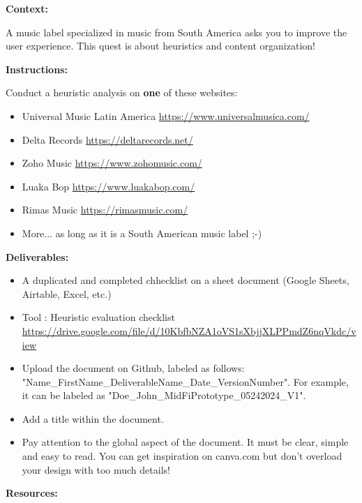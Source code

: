 \makeheaderfiles

\textbf{Context:}

A music label specialized in music from South America asks you to improve the user experience. This quest is about heuristics and content organization!

\textbf{Instructions:}

Conduct a heuristic analysis on \textbf{one} of these websites:

\begin{itemize}
\item Universal Music Latin America \url{https://www.universalmusica.com/}
\item Delta Records \url{https://deltarecords.net/}
\item Zoho Music \url{https://www.zohomusic.com/}
\item Luaka Bop \url{https://www.luakabop.com/}
\item Rimas Music \url{https://rimasmusic.com/}
\item More... as long as it is a South American music label ;-)
\end{itemize}

\textbf{Deliverables:}

\begin{itemize}
\item A duplicated and completed chhecklist on a sheet document (Google Sheets, Airtable, Excel, etc.)
\item Tool : Heuristic evaluation checklist \url{https://drive.google.com/file/d/10KbfbNZA1oVS1sXbjjXLPPmdZ6nqVkdc/view}
\item Upload the document on Github, labeled as follows: "Name\_FirstName\_DeliverableName\_Date\_VersionNumber". For example, it can be labeled as "Doe\_John\_MidFiPrototype\_05242024\_V1".
\item Add a title within the document.
\item Pay attention to the global aspect of the document. It must be clear, simple and easy to read. You can get inspiration on canva.com but don't overload your design with too much details!
\end{itemize}

\textbf{Resources:}

